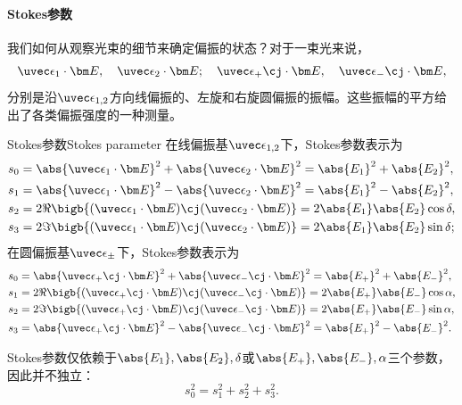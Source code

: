 \paragraph{Stokes参数}

我们如何从观察光束的细节来确定偏振的状态？对于一束光来说，
\[
    \uvec\epsilon_1\cdot\bm E,\quad\uvec\epsilon_2\cdot\bm E;\quad\uvec\epsilon_+\cj\cdot\bm E,\quad\uvec\epsilon_-\cj\cdot\bm E,
\]
分别是沿$\uvec\epsilon_{1,2}$方向线偏振的、左旋和右旋圆偏振的振幅。这些振幅的平方给出了各类偏振强度的一种测量。%

\begin{definition}
    {Stokes参数}{Stokes parameter}
    在线偏振基$\uvec\epsilon_{1,2}$下，Stokes参数表示为
    \begin{subequations}
        \begin{align}
            s_0&=\abs{\uvec\epsilon_1\cdot\bm E}^2+\abs{\uvec\epsilon_2\cdot\bm E}^2=\abs{E_1}^2+\abs{E_2}^2,\\
            s_1&=\abs{\uvec\epsilon_1\cdot\bm E}^2-\abs{\uvec\epsilon_2\cdot\bm E}^2=\abs{E_1}^2-\abs{E_2}^2,\\
            s_2&=2\Re\bigb{(\uvec\epsilon_1\cdot\bm E)\cj(\uvec\epsilon_2\cdot\bm E)}=2\abs{E_1}\abs{E_2}\cos\delta,\\
            s_3&=2\Im\bigb{(\uvec\epsilon_1\cdot\bm E)\cj(\uvec\epsilon_2\cdot\bm E)}=2\abs{E_1}\abs{E_2}\sin\delta;
        \end{align}
    \end{subequations}
    在圆偏振基$\uvec\epsilon_\pm$下，Stokes参数表示为
    \begin{subequations}
        \begin{align}
            s_0&=\abs{\uvec\epsilon_+\cj\cdot\bm E}^2+\abs{\uvec\epsilon_-\cj\cdot\bm E}^2=\abs{E_+}^2+\abs{E_-}^2,\\
            s_1&=2\Re\bigb{(\uvec\epsilon_+\cj\cdot\bm E)\cj(\uvec\epsilon_-\cj\cdot\bm E)}=2\abs{E_+}\abs{E_-}\cos\alpha,\\
            s_2&=2\Im\bigb{(\uvec\epsilon_+\cj\cdot\bm E)\cj(\uvec\epsilon_-\cj\cdot\bm E)}=2\abs{E_+}\abs{E_-}\sin\alpha,\\
            s_3&=\abs{\uvec\epsilon_+\cj\cdot\bm E}^2-\abs{\uvec\epsilon_-\cj\cdot\bm E}^2=\abs{E_+}^2-\abs{E_-}^2.
        \end{align}
    \end{subequations}
\end{definition}
\begin{corollary}
    Stokes参数仅依赖于$\abs{E_1},\abs{E_2},\delta$或$\abs{E_+},\abs{E_-},\alpha$三个参数，因此并不独立：
    \[
        s_0^2=s_1^2+s_2^2+s_3^2.
    \]
\end{corollary}

